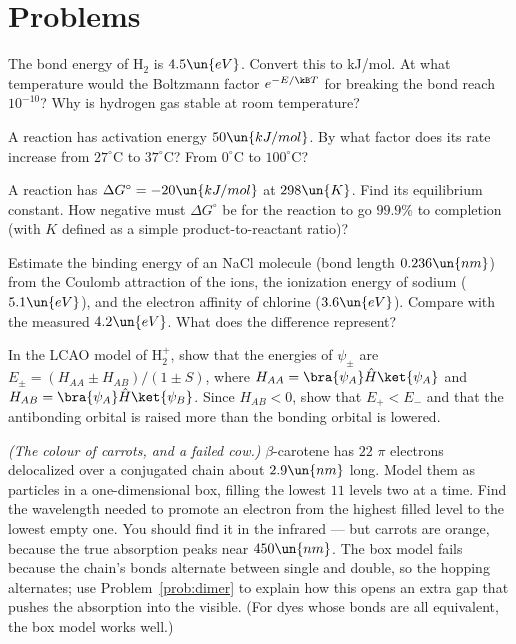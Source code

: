 \section{Problems}

\begin{problems}
 The bond energy of H$_2$ is $4.5\un{eV}$. Convert this to kJ/mol. At what temperature would the Boltzmann factor $e^{-E/\kB T}$ for breaking the bond reach $10^{-10}$? Why is hydrogen gas stable at room temperature?

\core A reaction has activation energy $50\un{kJ/mol}$. By what factor does its rate increase from $27^\circ\text{C}$ to $37^\circ\text{C}$? From $0^\circ\text{C}$ to $100^\circ\text{C}$?

 A reaction has $\Delta G^\circ = -20\un{kJ/mol}$ at $298\un{K}$. Find its equilibrium constant. How negative must $\Delta G^\circ$ be for the reaction to go $99.9\%$ to completion (with $K$ defined as a simple product-to-reactant ratio)?

 Estimate the binding energy of an NaCl molecule (bond length $0.236\un{nm}$) from the Coulomb attraction of the ions, the ionization energy of sodium ($5.1\un{eV}$), and the electron affinity of chlorine ($3.6\un{eV}$). Compare with the measured $4.2\un{eV}$. What does the difference represent?

\core In the LCAO model of H$_2^+$, show that the energies of $\psi_\pm$ are $E_\pm = (H_{AA}\pm H_{AB})/(1\pm S)$, where $H_{AA} = \bra{\psi_A}\hat H\ket{\psi_A}$ and $H_{AB} = \bra{\psi_A}\hat H\ket{\psi_B}$. Since $H_{AB}<0$, show that $E_+<E_-$ and that the antibonding orbital is raised more than the bonding orbital is lowered.

\core \label{prob:carotene} \emph{(The colour of carrots, and a failed cow.)} $\beta$-carotene has $22$ $\pi$ electrons delocalized over a conjugated chain about $2.9\un{nm}$ long. Model them as particles in a one-dimensional box, filling the lowest $11$ levels two at a time. Find the wavelength needed to promote an electron from the highest filled level to the lowest empty one. You should find it in the infrared --- but carrots are orange, because the true absorption peaks near $450\un{nm}$. The box model fails because the chain's bonds alternate between single and double, so the hopping alternates; use Problem~\ref{prob:dimer} to explain how this opens an extra gap that pushes the absorption into the visible. (For dyes whose bonds are all equivalent, the box model works well.)


\end{problems}
